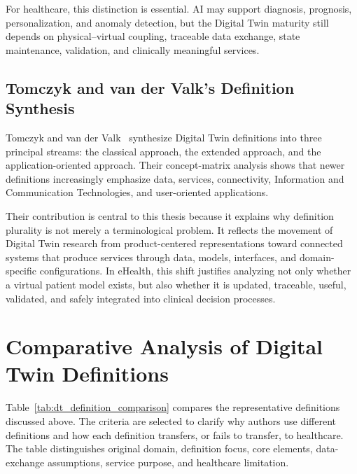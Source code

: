 For healthcare, this distinction is essential. AI may support diagnosis, prognosis, personalization, and anomaly detection, but the Digital Twin maturity still depends on physical--virtual coupling, traceable data exchange, state maintenance, validation, and clinically meaningful services.

\subsection{Tomczyk and van der Valk's Definition Synthesis}
Tomczyk and van der Valk~\cite{tomczyk2022paradigm} synthesize Digital Twin definitions into three principal streams: the classical approach, the extended approach, and the application-oriented approach. Their concept-matrix analysis shows that newer definitions increasingly emphasize data, services, connectivity, Information and Communication Technologies, and user-oriented applications.

Their contribution is central to this thesis because it explains why definition plurality is not merely a terminological problem. It reflects the movement of Digital Twin research from product-centered representations toward connected systems that produce services through data, models, interfaces, and domain-specific configurations. In eHealth, this shift justifies analyzing not only whether a virtual patient model exists, but also whether it is updated, traceable, useful, validated, and safely integrated into clinical decision processes.

\section{Comparative Analysis of Digital Twin Definitions}
Table~\ref{tab:dt_definition_comparison} compares the representative definitions discussed above. The criteria are selected to clarify why authors use different definitions and how each definition transfers, or fails to transfer, to healthcare. The table distinguishes original domain, definition focus, core elements, data-exchange assumptions, service purpose, and healthcare limitation.

